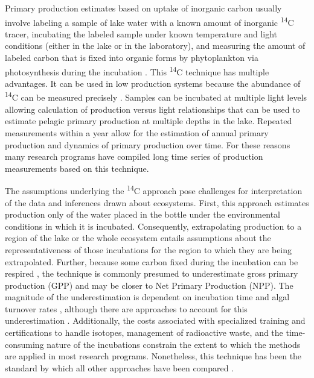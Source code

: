 \documentclass[12pt, oneside]{article}
\begin{document}
Primary production estimates based on uptake of inorganic carbon usually involve labeling a sample of lake water with a known amount of inorganic \textsuperscript{14}C tracer, incubating the labeled sample under known temperature and light conditions (either in the lake or in the laboratory), and measuring the amount of labeled carbon that is fixed into organic forms by phytoplankton via photosynthesis during the incubation \citep{Fee_1973,peterson_aquatic_1980}. This \textsuperscript{14}C technique has multiple advantages. It can be used in low production systems because the abundance of \textsuperscript{14}C can be measured precisely \citep{hall_measuring_2007}. Samples can be incubated at multiple light levels allowing calculation of production versus light relationships that can be used to estimate pelagic primary production at multiple depths in the lake. Repeated measurements within a year allow for the estimation of annual primary production and dynamics of primary production over time. For these reasons many research programs have compiled long time series of production measurements based on this technique.

The assumptions underlying the \textsuperscript{14}C approach pose challenges for interpretation of the data and inferences drawn about ecosystems. First, this approach estimates production only of the water placed in the bottle under the environmental conditions in which it is incubated. Consequently, extrapolating production to a region of the lake or the whole ecosystem entails assumptions about the representativeness of those incubations for the region to which they are being extrapolated. Further, because some carbon fixed during the incubation can be respired \citep{Vollenweider_Talling_Westlake_1974, peterson_aquatic_1980}, the technique is commonly presumed to underestimate gross primary production (GPP) and may be closer to Net Primary Production (NPP). The magnitude of the underestimation is dependent on incubation time and algal turnover rates \citep{hall_measuring_2007}, although there are approaches to account for this underestimation \citep{Legendre_Demers_Yentsch_Yentsch_1983}. Additionally, the costs associated with specialized training and certifications to handle isotopes, management of radioactive waste, and the time-consuming nature of the incubations constrain the extent to which the methods are applied in most research programs. Nonetheless, this technique has been the standard by which all other approaches have been compared \citep{peterson_aquatic_1980}.
\end{document}
